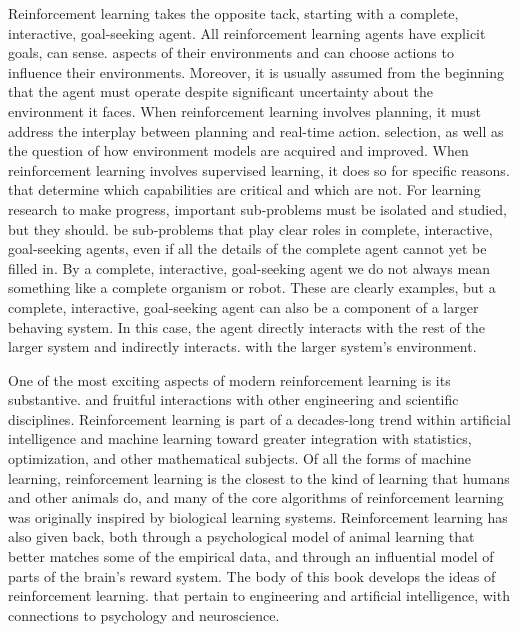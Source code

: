 Reinforcement learning takes the opposite tack, starting with a complete, interactive,
goal-seeking agent. All reinforcement learning agents have explicit goals, can sense.
aspects of their environments and can choose actions to influence their environments.
Moreover, it is usually assumed from the beginning that the agent must operate despite
significant uncertainty about the environment it faces. When reinforcement learning
involves planning, it must address the interplay between planning and real-time action.
selection, as well as the question of how environment models are acquired and improved.
When reinforcement learning involves supervised learning, it does so for specific reasons.
that determine which capabilities are critical and which are not. For learning research to
make progress, important sub-problems must be isolated and studied, but they should.
be sub-problems that play clear roles in complete, interactive, goal-seeking agents, 
even if all the details of the complete agent cannot yet be filled in.
By a complete, interactive, goal-seeking agent we do not always mean something like
a complete organism or robot. These are clearly examples, but a complete, interactive,
goal-seeking agent can also be a component of a larger behaving system. In this case,
the agent directly interacts with the rest of the larger system and indirectly interacts.
with the larger system's environment. 

One of the most exciting aspects of modern reinforcement learning is its substantive.
and fruitful interactions with other engineering and scientific disciplines. 
Reinforcement learning is part of a decades-long trend within artificial intelligence and machine learning toward greater integration with statistics, optimization, and other mathematical subjects.
Of all the forms of machine learning, reinforcement learning is the closest to the kind of learning that humans and other animals do, and many of the core algorithms of reinforcement
learning was originally inspired by biological learning systems. Reinforcement learning
has also given back, both through a psychological model of animal learning that better
matches some of the empirical data, and through an influential model of parts of the
brain's reward system. The body of this book develops the ideas of reinforcement learning.
that pertain to engineering and artificial intelligence, with connections to psychology and
neuroscience.

